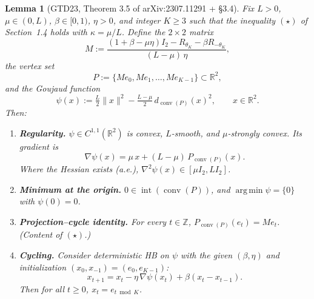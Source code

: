 \documentclass[11pt]{article}
\newtheorem{lemma}[theorem]{Lemma}
\theoremstyle{definition}
\theoremstyle{remark}
\DeclareMathOperator*{\argmin}{arg\,min}
\DeclareMathOperator{\conv}{conv}
\DeclareMathOperator{\interior}{int}
\begin{document}
\begin{lemma}[GTD23, Theorem 3.5 of arXiv:2307.11291 + \S3.4]
\label{lem:gpt23}
Fix $L > 0$, $\mu \in (0, L)$, $\beta \in [0, 1)$, $\eta > 0$, and integer $K \geq 3$ such that the inequality $(\star)$ of Section~1.4 holds with $\kappa = \mu/L$. Define the $2 \times 2$ matrix
\begin{equation}
  M := \frac{(1 + \beta - \mu \eta) I_2 - R_{\theta_K} - \beta R_{-\theta_K}}{(L - \mu)\, \eta},\tag{M-def}
\end{equation}
the vertex set
\[
  P := \{M e_0, M e_1, \ldots, M e_{K-1}\} \subset \mathbb{R}^2,
\]
and the \emph{Goujaud function}
\begin{equation}
  \psi(x) := \tfrac{L}{2}\|x\|^2 - \tfrac{L - \mu}{2}\, d_{\conv(P)}(x)^2,\qquad x \in \mathbb{R}^2.\tag{PSI}
\end{equation}
Then:
\begin{enumerate}
\item[(i)] \textbf{Regularity.} $\psi \in C^{1,1}(\mathbb{R}^2)$ is convex, $L$-smooth, and $\mu$-strongly convex. Its gradient is
\begin{equation}
  \nabla \psi(x) = \mu\, x + (L - \mu)\, P_{\conv(P)}(x).\tag{PSI-grad}
\end{equation}
Where the Hessian exists (a.e.), $\nabla^2 \psi(x) \in [\mu I_2, L I_2]$.
\item[(ii)] \textbf{Minimum at the origin.} $0 \in \interior(\conv(P))$, and $\argmin \psi = \{0\}$ with $\psi(0) = 0$.
\item[(iii)] \textbf{Projection--cycle identity.} For every $t \in \mathbb{Z}$, $P_{\conv(P)}(e_t) = M e_t$. (Content of $(\star)$.)
\item[(iv)] \textbf{Cycling.} Consider deterministic HB on $\psi$ with the given $(\beta, \eta)$ and initialization $(x_0, x_{-1}) = (e_0, e_{K-1})$:
\[
  x_{t+1} = x_t - \eta\, \nabla \psi(x_t) + \beta (x_t - x_{t-1}).
\]
Then for all $t \geq 0$, $x_t = e_{t \bmod K}$.
\end{enumerate}
\end{lemma}
\end{document}
